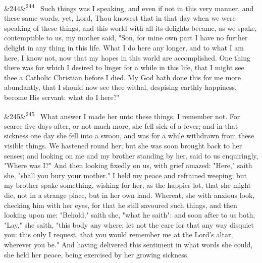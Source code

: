 \documentclass[12pt]{article}
\newcommand{\para}[1][]{\par\noindent\ifx&#1&\else\textsuperscript{\footnotesize #1}~\fi}
\begin{document}
\para[244] Such things was I speaking, and even if not in this very manner, and these same words, yet, Lord, Thou knowest that in that day when we were speaking of these things, and this world with all its delights became, as we spake, contemptible to us, my mother said, "Son, for mine own part I have no further delight in any thing in this life. What I do here any longer, and to what I am here, I know not, now that my hopes in this world are accomplished. One thing there was for which I desired to linger for a while in this life, that I might see thee a Catholic Christian before I died. My God hath done this for me more abundantly, that I should now see thee withal, despising earthly happiness, become His servant: what do I here?"

\para[245] What answer I made her unto these things, I remember not. For scarce five days after, or not much more, she fell sick of a fever; and in that sickness one day she fell into a swoon, and was for a while withdrawn from these visible things. We hastened round her; but she was soon brought back to her senses; and looking on me and my brother standing by her, said to us enquiringly, "Where was I?" And then looking fixedly on us, with grief amazed: "Here," saith she, "shall you bury your mother." I held my peace and refrained weeping; but my brother spake something, wishing for her, as the happier lot, that she might die, not in a strange place, but in her own land. Whereat, she with anxious look, checking him with her eyes, for that he still savoured such things, and then looking upon me: "Behold," saith she, "what he saith": and soon after to us both, "Lay," she saith, "this body any where; let not the care for that any way disquiet you: this only I request, that you would remember me at the Lord's altar, wherever you be." And having delivered this sentiment in what words she could, she held her peace, being exercised by her growing sickness.
\end{document}
